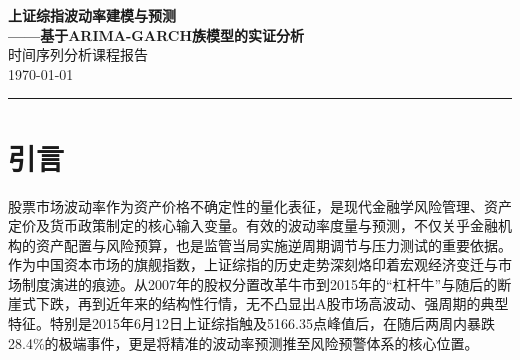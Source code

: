 \documentclass[12pt,a4paper]{ctexart}
\begin{document}
\begin{center}
\vspace{2cm}
{\LARGE \textbf{上证综指波动率建模与预测}}\\[8pt]
{\large \textbf{——基于ARIMA-GARCH族模型的实证分析}}\\[1.5cm]
{\large 时间序列分析课程报告}\\[1cm]
{\large \today}
\end{center}

\vspace{2cm}
\begin{center}
\rule{0.8\linewidth}{0.4pt}
\end{center}

\newpage

\begin{abstract}
\noindent
股票市场波动率的精准度量与预测是金融风险管理、资产定价及政策制定的核心议题。中国A股市场因其独特的制度环境与投资者结构，收益率呈现出显著的“尖峰厚尾”、波动率聚集及非对称性等复杂特征，对传统建模方法提出了挑战。本文以2000年1月至2026年6月上证综指的日度数据为样本，系统构建并比较了ARIMA-GARCH(1,1)-Normal、ARIMA-GARCH(1,1)-$t$、ARIMA-EGARCH(1,1)-$t$及ARIMA-APARCH(1,1)-$t$四种模型在波动率拟合与预测中的表现。研究遵循“均值方程过滤—条件异方差检验—波动率建模—滚动预测评估”的规范流程。结果表明：在样本内拟合方面，引入学生$t$分布与杠杆效应的EGARCH(1,1)-$t$模型表现最优（AIC=20379.58），其自由度参数（$\nu=4.77$）与杠杆项系数均高度显著，有力验证了收益率的厚尾性与波动率的非对称响应；在样本外滚动预测方面，EGARCH(1,1)-$t$模型同样以最低的RMSE（0.8181）和MAE（0.5975）保持领先，而APARCH(1,1)-$t$模型则在QLIKE损失函数下表现最佳（0.9289）。Diebold-Mariano检验进一步确认了非对称模型相对对称模型的预测优势具有统计显著性。本文研究不仅为上证综指波动率刻画提供了稳健的模型选择参考，更揭示了在金融建模中合理平衡模型复杂度与泛化能力的重要性。

\vspace{8pt}
\noindent\textbf{关键词：}上证综指；GARCH模型；EGARCH模型；APARCH模型；波动率预测；滚动窗口

\end{abstract}

\newpage
\tableofcontents
\newpage

\section{引言}

股票市场波动率作为资产价格不确定性的量化表征，是现代金融学风险管理、资产定价及货币政策制定的核心输入变量。有效的波动率度量与预测，不仅关乎金融机构的资产配置与风险预算，也是监管当局实施逆周期调节与压力测试的重要依据。作为中国资本市场的旗舰指数，上证综指的历史走势深刻烙印着宏观经济变迁与市场制度演进的痕迹。从2007年的股权分置改革牛市到2015年的“杠杆牛”与随后的断崖式下跌，再到近年来的结构性行情，无不凸显出A股市场高波动、强周期的典型特征。特别是2015年6月12日上证综指触及5166.35点峰值后，在随后两周内暴跌28.4\%的极端事件\cite{xu2001}，更是将精准的波动率预测推至风险预警体系的核心位置。
\end{document}
